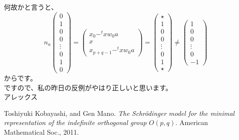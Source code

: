 \documentclass[10pt]{article} %
\begin{document}
\begin{CJK}{UTF8}{min}
何故かと言うと、
\[n_a\begin{pmatrix}0\\1\\0\\0\\\vdots\\0\\1\\0\end{pmatrix}=
\begin{pmatrix}x_0-^txw_0a\\x\\x_{p+q-1}-^txw_0a\end{pmatrix}=
\begin{pmatrix}\star\\1\\0\\0\\\vdots\\0\\1\\\star\end{pmatrix}\neq
\begin{pmatrix}1\\0\\0\\\vdots\\0\\-1\end{pmatrix}
\]
からです。\\

ですので、私の昨日の反例がやはり正しいと思います。\\

アレックス
\end{CJK}
\begin{thebibliography}{9}
Toshiyuki Kobayashi, and Gen Mano. 
	{\em The Schrödinger model for the minimal representation of the indefinite orthogonal group $O(p, q)$}. American Mathematical Soc., 2011.
\end{thebibliography}
\end{document}
